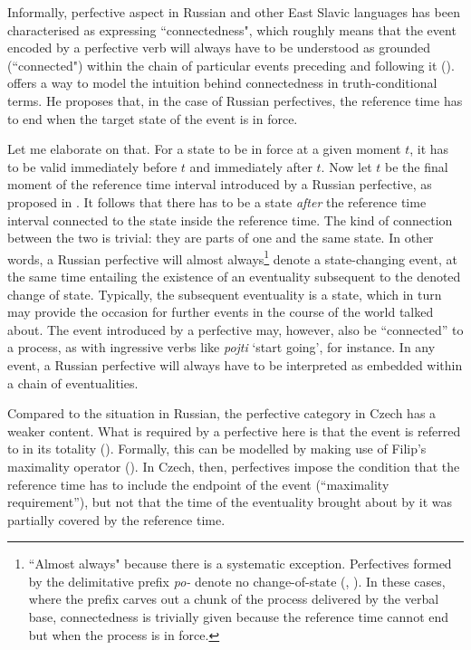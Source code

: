 \documentclass[output=paper,colorlinks,citecolor=brown]{langscibook}
\begin{document}
Informally, perfective aspect in Russian and other East Slavic languages has been characterised as expressing ``connectedness", which roughly means that the event encoded by a perfective verb will always have to be understood as grounded (``connected") within the chain of particular events preceding and following it (\citealt{Barentsen95, Barentsen98, mue:Dickey2000, Dickey15, Stunova1991, Stunova1993}). \citet{Gronn2004} offers a way to model the intuition behind connectedness in truth-conditional terms. He proposes that, in the case of Russian perfectives, the reference time has to end when the target state of the event is in force. 

Let me elaborate on that.
For a state to be in force at a given moment $t$, it has to be valid immediately before $t$ and immediately after $t$.
Now let $t$ be the final moment of the reference time interval introduced by a Russian perfective, as proposed in \citet{Gronn2004}.
It follows that there has to be a state \textit{after} the reference time interval connected to the state inside the reference time. The kind of connection between the two is trivial: they are parts of one and the same state. In other words, a Russian perfective will almost always\footnote{``Almost always" because there is a systematic exception. Perfectives formed by the delimitative prefix \textit{po-} denote no change-of-state (\citealt{mue:Filip2000}, \citealt{Dickey2006}). In these cases, where the prefix carves out a chunk of the process delivered by the verbal base, connectedness is trivially given because the reference time cannot end but when the process is in force.} 
denote a state-changing event, at the same time entailing the existence of an eventuality subsequent to the denoted change of state. Typically, the subsequent eventuality is a state, which in turn may provide the occasion for further events in the course of the world talked about. The event introduced by a perfective may, however, also be ``connected'' to a process, as with ingressive verbs like \textit{pojti} `start going', for instance. In any event, a Russian perfective will always have to be interpreted as embedded within a chain of eventualities.

Compared to the situation in Russian, the perfective category in Czech has a weaker content. 
What is required by a perfective here is that the event is referred to in its totality (\citealt{Stunova1991, Stunova1993}). Formally, this can be modelled by making use of Filip's maximality operator (\citealt{Filip2008, Filip17}). In Czech, then, perfectives impose the condition that the reference time has to include the endpoint of the event (``maximality requirement''), but not that the time of the eventuality brought about by it was partially covered by the reference time. 
\end{document}
